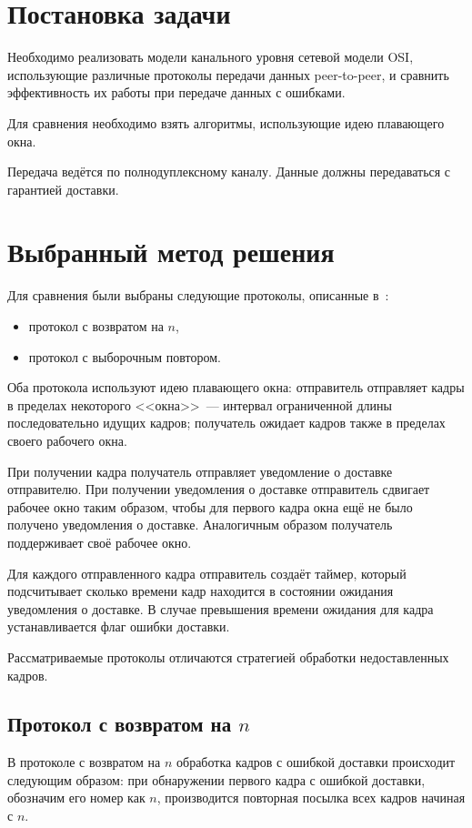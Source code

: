 \documentclass[a4paper,10pt]{article}
\begin{document}


\tableofcontents
\pagebreak


\section{Постановка задачи}
Необходимо реализовать модели канального уровня сетевой модели OSI, 
использующие различные протоколы передачи данных peer-to-peer, 
и сравнить эффективность их работы при передаче данных с ошибками.

Для сравнения необходимо взять алгоритмы, 
использующие идею плавающего окна.

Передача ведётся по полнодуплексному каналу.
Данные должны передаваться с гарантией доставки.

\section{Выбранный метод решения}
Для сравнения были выбраны следующие протоколы, описанные в~\cite{tanenbaum2003compnet}:
\begin{itemize}
  \item протокол с возвратом на $n$,
  \item протокол с выборочным повтором.
\end{itemize}

Оба протокола используют идею плавающего окна:
отправитель отправляет кадры в пределах некоторого <<окна>>~--- 
интервал ограниченной длины последовательно идущих кадров;
получатель ожидает кадров также в пределах своего рабочего окна.

При получении кадра получатель отправляет уведомление о доставке 
отправителю.
При получении уведомления о доставке отправитель сдвигает рабочее окно
таким образом, чтобы для первого кадра окна ещё не было получено
уведомления о доставке.
Аналогичным образом получатель поддерживает своё рабочее окно.

Для каждого отправленного кадра отправитель создаёт таймер, 
который подсчитывает сколько времени кадр находится в состоянии ожидания
уведомления о доставке.
В случае превышения времени ожидания для кадра устанавливается флаг ошибки доставки.

Рассматриваемые протоколы отличаются стратегией обработки недоставленных кадров.

\subsection{Протокол с возвратом на $n$}
В протоколе с возвратом на $n$ обработка кадров с ошибкой доставки происходит следующим образом:
при обнаружении первого кадра с ошибкой доставки, обозначим его номер как $n$,
производится повторная посылка всех кадров начиная с $n$.
\end{document}
